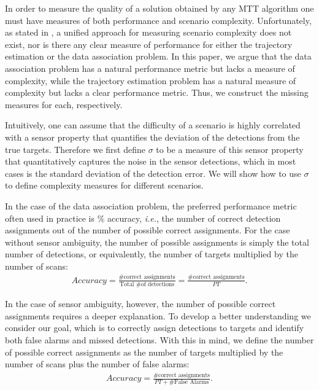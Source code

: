 In order to measure the quality of a solution obtained by any MTT algorithm one must have measures of both performance and scenario complexity. Unfortunately, as stated in \cite{MTT-Taxonomy}, a unified approach for measuring scenario complexity does not exist, nor is there any clear measure of performance for either the trajectory estimation or the data association problem. In this paper, we argue that the data association problem has a natural performance metric but lacks a measure of complexity, while the trajectory estimation problem has a natural measure of complexity but lacks a clear performance metric. Thus, we construct the missing measures for each, respectively.

Intuitively, one can assume that the difficulty of a scenario is highly correlated with a sensor property that quantifies the deviation of the detections from the true targets. Therefore we first define $\sigma$ to be a measure of this sensor property that quantitatively captures the noise in the sensor detections, which in most cases is the standard deviation of the detection error. We will show how to use $\sigma$ to define complexity measures for different scenarios.

In the case of the data association problem, the preferred performance metric often used in practice is \% accuracy, \textit{i.e.}, the number of correct detection assignments out of the number of possible correct assignments. For the case without sensor ambiguity, the number of possible assignments is simply the total number of detections, or equivalently, the number of targets multiplied by the number of scans: 
\begin{align*}
Accuracy =  \frac{\text{\# correct assignments}}{\text{Total \# of detections}}= \frac{\text{\# correct assignments}}{PT}.
\end{align*}

In the case of sensor ambiguity, however, the number of possible correct assignments requires a deeper explanation. To develop a better understanding we consider our goal, which is to correctly assign detections to targets and identify both false alarms and missed detections. With this in mind, we define the number of possible correct assignments as the number of targets multiplied by the number of scans plus the number of false alarms:
\begin{align*}
Accuracy =  \frac{\text{\# correct assignments}}{PT + \text{\# False Alarms}}.
\end{align*}

